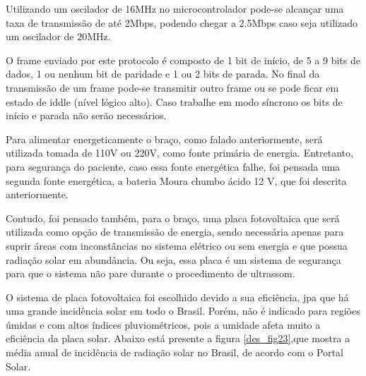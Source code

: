 Utilizando um oscilador de 16MHz no microcontrolador pode-se alcançar uma taxa de transmissão de até 2Mbps, podendo chegar a 2.5Mbps caso seja utilizado um oscilador de 20MHz.

O frame enviado por este protocolo é composto de 1 bit de início, de 5 a 9 bits de dados, 1 ou nenhum bit de paridade e 1 ou 2 bits de parada. No final da transmissão de um frame pode-se transmitir outro frame ou se pode ficar em estado de iddle (nível lógico alto). Caso trabalhe em modo síncrono os bits de início e parada não serão necessários.

Para alimentar energeticamente o braço, como falado anteriormente, será utilizada tomada de 110V ou 220V, como fonte primária de energia. Entretanto, para segurança do paciente, caso essa fonte energética falhe, foi pensada uma segunda fonte energética, a bateria Moura chumbo ácido 12 V, que foi descrita anteriormente.

Contudo, foi pensado também, para o braço, uma placa fotovoltaica que será utilizada como opção de transmissão de energia, sendo necessária apenas para suprir áreas com inconstâncias no sistema elétrico ou sem energia e que possua radiação solar em abundância. Ou seja, essa placa é um sistema de segurança para que o sistema não pare durante o procedimento de ultrassom.

O sistema de placa fotovoltaica foi escolhido devido a sua eficiência, jpa que há uma grande incidência solar em todo o Brasil. Porém, não é indicado para regiões úmidas e com altos índices pluviométricos, pois a umidade afeta muito a eficiência da placa solar. Abaixo está presente a figura \ref{des_fig23},que mostra a média anual de incidência de radiação solar no Brasil, de acordo com o Portal Solar.

